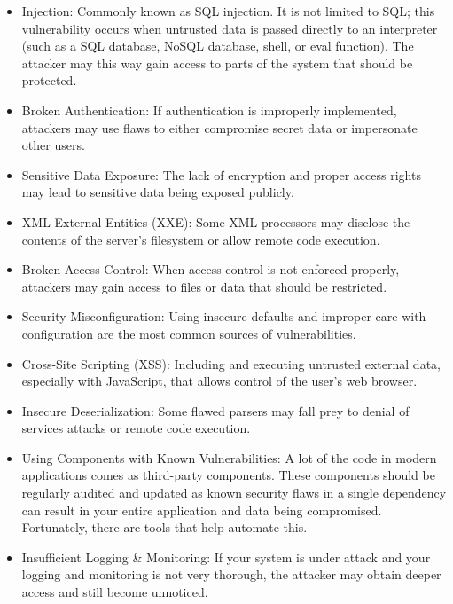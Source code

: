 \begin{itemize}
\item 
Injection: Commonly known as SQL injection. It is not limited to SQL; this vulnerability occurs when untrusted data is passed directly to an interpreter (such as a SQL database, NoSQL database, shell, or eval function). The attacker may this way gain access to parts of the system that should be protected.

\item 
Broken Authentication: If authentication is improperly implemented, attackers may use flaws to either compromise secret data or impersonate other users.

\item 
Sensitive Data Exposure: The lack of encryption and proper access rights may lead to sensitive data being exposed publicly.

\item 
XML External Entities (XXE): Some XML processors may disclose the contents of the server's filesystem or allow remote code execution.

\item 
Broken Access Control: When access control is not enforced properly, attackers may gain access to files or data that should be restricted.

\item 
Security Misconfiguration: Using insecure defaults and improper care with configuration are the most common sources of vulnerabilities.

\item 
Cross-Site Scripting (XSS): Including and executing untrusted external data, especially with JavaScript, that allows control of the user's web browser. 

\item 
Insecure Deserialization: Some flawed parsers may fall prey to denial of services attacks or remote code execution.

\item 
Using Components with Known Vulnerabilities: A lot of the code in modern applications comes as third-party components. These components should be regularly audited and updated as known security flaws in a single dependency can result in your entire application and data being compromised. Fortunately, there are tools that help automate this.

\item 
Insufficient Logging \& Monitoring: If your system is under attack and your logging and monitoring is not very thorough, the attacker may obtain deeper access and still become unnoticed.
\end{itemize}


